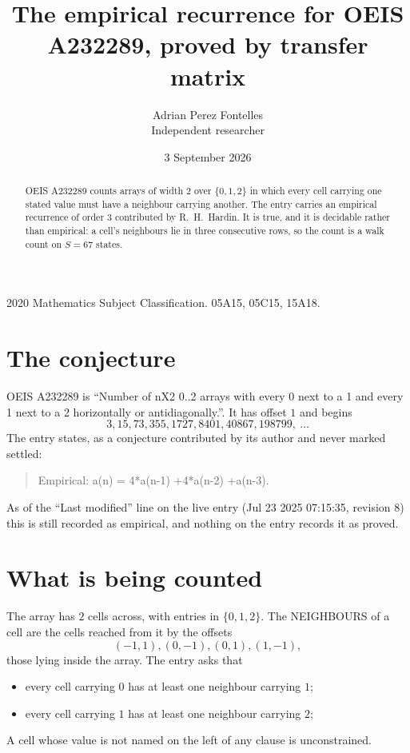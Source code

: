\documentclass[11pt,a4paper]{article}
\title{The empirical recurrence for OEIS A232289, proved by transfer matrix}
\author{Adrian Perez Fontelles\\ \small Independent researcher}
\date{3 September 2026}
\theoremstyle{plain}
\theoremstyle{definition}
\begin{document}
\maketitle

\begin{abstract}
OEIS A232289 counts arrays of width $2$ over $\{0,1,2\}$ in which every cell carrying one stated
value must have a neighbour carrying another. The entry carries an empirical recurrence of
order $3$ contributed by R.~H.~Hardin. It is true, and it is decidable rather than
empirical: a cell's neighbours lie in three consecutive rows, so the count is a walk count on
$S=67$ states.
\end{abstract}

\noindent\small 2020 Mathematics Subject Classification. 05A15, 05C15, 15A18.\normalsize

\section{The conjecture}

OEIS A232289 is ``Number of nX2 0..2 arrays with every 0 next to a 1 and every 1 next to a 2 horizontally or antidiagonally.''. It has offset $1$ and begins
\[
3, 15, 73, 355, 1727, 8401, 40867, 198799,\ \dots
\]
The entry states, as a conjecture contributed by its author and never marked settled:
\begin{quote}
Empirical: a(n) = 4*a(n-1) +4*a(n-2) +a(n-3).
\end{quote}
As of the ``Last modified'' line on the live entry (Jul 23 2025 07:15:35, revision 8) this is still
recorded as empirical, and nothing on the entry records it as proved.

\section{What is being counted}

The array has $2$ cells across, with entries in $\{0,1,2\}$. The NEIGHBOURS of a cell are the
cells reached from it by the offsets
\[
(-1,1), (0,-1), (0,1), (1,-1),
\]
those lying inside the array. The entry asks that
\begin{itemize}
\item every cell carrying $0$ has at least one neighbour carrying $1$;
\item every cell carrying $1$ has at least one neighbour carrying $2$;

\end{itemize}
A cell whose value is not named on the left of any clause is unconstrained.
\end{document}
